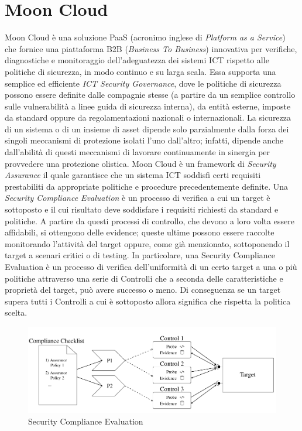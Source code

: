 \section{Moon Cloud}
Moon Cloud è una soluzione PaaS (acronimo inglese di \textit{Platform as a Service}) che fornice una piattaforma B2B 
(\textit{Business To Business}) innovativa per verifiche, diagnostiche e monitoraggio dell'adeguatezza dei sistemi ICT rispetto alle politiche di 
sicurezza, in modo continuo e su larga scala. Essa supporta una semplice ed efficiente \textit{ICT Security Governance}, dove le politiche 
di sicurezza possono essere definite dalle compagnie stesse (a partire da un semplice controllo sulle vulnerabilità a linee guida di
sicurezza interna), da entità esterne, imposte da standard oppure da regolamentazioni nazionali o internazionali.
La sicurezza di un sistema o di un insieme di asset dipende solo parzialmente dalla forza dei singoli meccanismi di protezione isolati
l'uno dall'altro; infatti, dipende anche dall'abilità di questi meccanismi di lavorare continuamente in sinergia per provvedere una 
protezione olistica.\hfill\break
Moon Cloud è un framework di \textit{Security Assurance} il quale garantisce che un sistema ICT soddisfi certi requisiti 
prestabiliti da appropriate politiche e procedure precedentemente definite.
Una \textit{Security Compliance Evaluation} è un processo di verifica a cui un target è sottoposto e il cui risultato 
deve soddisfare i requisiti richiesti da standard e politiche. A partire da questi processi di controllo, che devono a loro volta essere 
affidabili, si ottengono delle evidence; queste ultime possono essere raccolte monitorando l'attività del target oppure, come già 
menzionato, sottoponendo il target a scenari critici o di testing.\hfill\break
In particolare, una Security Compliance Evaluation è un processo di verifica dell'uniformità di un certo target a una o più politiche 
attraverso una serie di Controlli che a seconda delle caratteristiche e proprietà del target, può avere successo o meno. Di 
conseguenza se un target supera tutti i Controlli a cui è sottoposto allora significa che rispetta la politica scelta.
\begin{figure}[ht!]
    \includegraphics[scale=0.5]{images/Security_Compliance_Evaluation.png}
    \caption{Security Compliance Evaluation}
    \label{fig:Security_Compliance_Evaluation}
\end{figure}
